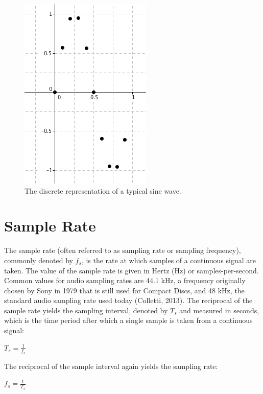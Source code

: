 \documentclass[12pt,twoside]{report}
\begin{document}
\begin{figure}[h!]

  \centering

  \includegraphics[scale=0.5]{img/disc}

  \caption{The discrete representation of a typical sine wave.}

  \label{fig:disc}

\end{figure}

\section{Sample Rate}

The sample rate (often referred to as sampling rate or sampling frequency), commonly denoted by $f_{s}$, is the rate at which samples of a continuous signal are taken. The value of the sample rate is given in Hertz (Hz) or samples-per-second. Common values for audio sampling rates are 44.1 kHz, a frequency originally chosen by Sony in 1979 that is still used for Compact Discs, and 48 kHz, the standard audio sampling rate used today  (Colletti, 2013). The reciprocal of the sample rate yields the sampling interval, denoted by $T_{s}$ and measured in seconds, which is the time period after which a single sample is taken from a continuous signal:\begin{center} $T_{s} = \frac{1}{f_{s}}$ \end{center} The reciprocal of the sample interval again yields the sampling rate: \begin{center} $f_{s} = \frac{1}{T_{s}}$ \end{center}
\end{document}

